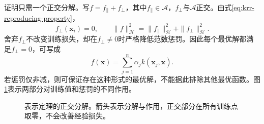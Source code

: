 证明只需一个正交分解。写$f=f_{\parallel}+f_{\perp}$，其中$f_{\parallel}\in\mathcal A$，$f_{\perp}$与$\mathcal A$正交。由式\eqref{eq:krr-reproducing-property}，
\begin{equation}
 f_{\perp}(\bm x_i)=0,\qquad
 \|f\|_{\mathcal H}^2=\|f_{\parallel}\|_{\mathcal H}^2+\|f_{\perp}\|_{\mathcal H}^2.
\end{equation}
舍弃$f_{\perp}$不改变训练损失，却在$f_{\perp}\ne0$时严格降低范数惩罚。因此每个最优解都满足$f_{\perp}=0$，可写成
\begin{equation}
 f(\bm x)=\sum_{j=1}^n\alpha_j k(\bm x_j,\bm x).
 \label{eq:krr-representer-expansion}
\end{equation}
若惩罚仅非减，则可保证存在这种形式的最优解，不能据此排除其他最优函数。图\ref{fig:krr-representer-decomposition}表示两部分对训练值和惩罚的不同作用。

\begin{figure}[htbp]
\centering
{}
\caption{表示定理的正交分解。箭头表示分解与作用，正交部分在所有训练点取零，不会改善经验损失。}
\label{fig:krr-representer-decomposition}
\end{figure}

